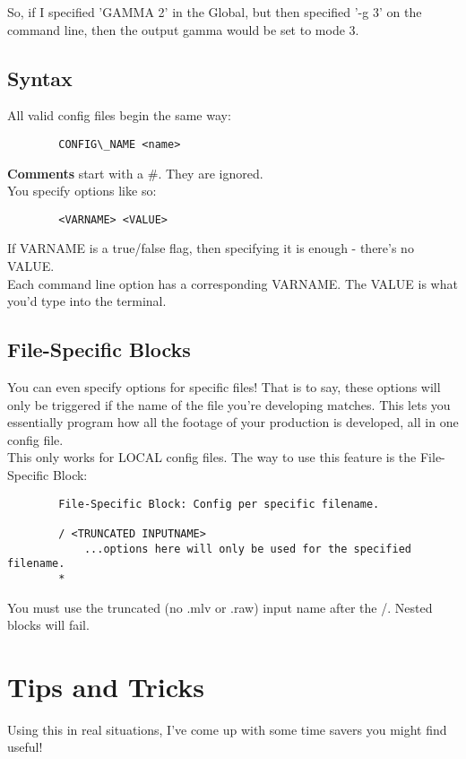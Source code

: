 \documentclass[a4paper,12pt]{article}
\begin{document}
		So, if I specified 'GAMMA 2' in the Global, but then specified '-g 3' on the command line,
		then the output gamma would be set to mode 3.
		
	\subsection{Syntax}
		All valid config files begin the same way:
			
		\begin{verbatim}
        CONFIG\_NAME <name>
		\end{verbatim}
			
		\textbf{Comments} start with a \#. They are ignored.\\
		
		You specify options like so:
		
		\begin{verbatim}
        <VARNAME> <VALUE>
		\end{verbatim}
		
		If VARNAME is a true/false flag, then specifying it is enough - there's no VALUE.\\
		
		Each command line option has a corresponding VARNAME. The VALUE is what you'd type into the terminal.
		
	\subsection{File-Specific Blocks}
		You can even specify options for specific files! That is to say, these options will only be triggered if the name of the file
		you're developing matches. This lets you essentially program how all the footage of your production is developed, all in one config file.\\
		
		This only works for LOCAL config files. The way to use this feature is the File-Specific Block:
		
		\begin{verbatim}
        File-Specific Block: Config per specific filename.
        
        / <TRUNCATED INPUTNAME>
            ...options here will only be used for the specified filename.
        *
		\end{verbatim}
		
		You must use the truncated (no .mlv or .raw) input name after the /. Nested blocks will fail.

\section{Tips and Tricks}
	Using this in real situations, I've come up with some time savers you might find useful!
	
\end{document}
